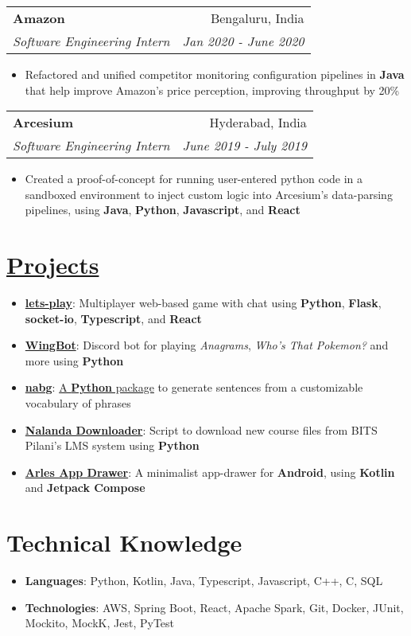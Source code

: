 \documentclass[a4paper,11pt]{article}
\makeatletter
\newcommand{\resumeItem}[2]{
  \item\small{
    \textbf{#1}{: #2 \vspace{-2pt}}
  }
}
\newcommand{\resumeItemNoTitle}[1]{
  \item\small{
    {#1 \vspace{-2pt}}
  }
}
\newcommand{\resumeSubheading}[4]{
  \vspace{2pt}
    \begin{tabular*}{\textwidth}{l@{\extracolsep{\fill}}r}
      \textbf{#1} & #2 \\
      \textit{\small#3} & \textit{\small #4} \\
    \end{tabular*}\vspace{-2pt}
}
\newcommand{\resumeItemListStart}{\begin{itemize}}
\newcommand{\resumeItemListEnd}{\end{itemize}\vspace{-2pt}}
\makeatother
\begin{document}
\resumeSubheading
{Amazon}{Bengaluru, India}
{Software Engineering Intern}{Jan 2020 - June 2020}
\resumeItemListStart
\resumeItemNoTitle{Refactored and unified competitor monitoring configuration pipelines in \textbf{Java} that help improve Amazon's price perception, improving throughput by 20\%}
\resumeItemListEnd

\resumeSubheading
{Arcesium}{Hyderabad, India}
{Software Engineering Intern}{June 2019 - July 2019}
\resumeItemListStart
\resumeItemNoTitle{Created a proof-of-concept for running user-entered python code in a sandboxed environment to inject custom logic into Arcesium's data-parsing pipelines, using \textbf{Java}, \textbf{Python}, \textbf{Javascript}, and \textbf{React}}
\resumeItemListEnd


\section{\href{https://naveen-u.github.io/projects/}{Projects}}
\resumeItemListStart
\resumeItem{\href{https://github.com/naveen-u/lets-play}{lets-play}}
{Multiplayer web-based game with chat using \textbf{Python}, \textbf{Flask}, \textbf{socket-io}, \textbf{Typescript}, and \textbf{React}}
\resumeItem{\href{https://github.com/naveen-u/WingBot}{WingBot}}
{Discord bot for playing \textit{Anagrams}, \textit{Who's That Pokemon?} and more using \textbf{Python}}
\resumeItem{\href{https://github.com/naveen-u/nabg}{nabg}}
{\href{https://pypi.org/project/nabg/}{A \textbf{Python} package} to generate sentences from a customizable vocabulary of phrases}
\resumeItem{\href{https://github.com/naveen-u/Nalanda-Downloader}{Nalanda Downloader}}
{Script to download new course files from BITS Pilani's LMS system using \textbf{Python}}
\resumeItem{\href{https://github.com/naveen-u/arles-app-drawer}{Arles App Drawer}}
{A minimalist app-drawer for \textbf{Android}, using \textbf{Kotlin} and \textbf{Jetpack Compose}}
\resumeItemListEnd

\section{Technical Knowledge}
\resumeItemListStart
\resumeItem{Languages}{Python, Kotlin, Java, Typescript, Javascript, C++, C, SQL}
\resumeItem{Technologies}{AWS, Spring Boot, React, Apache Spark, Git, Docker, JUnit, Mockito, MockK, Jest, PyTest}
\resumeItemListEnd


\end{document}

